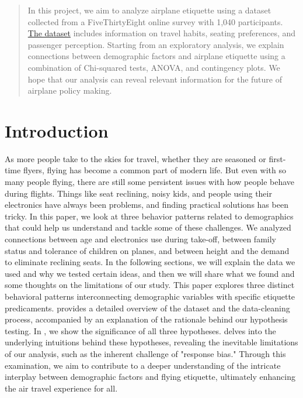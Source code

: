 \documentclass{article}
\theoremstyle{plain}
\theoremstyle{definition}
\theoremstyle{remark}
\begin{document}
\printAffiliationsAndNotice{\icmlEqualContribution} %

\begin{abstract}
In this project, we aim to analyze airplane etiquette using a dataset collected from a FiveThirtyEight online survey with 1,040 participants. \href{https://github.com/fivethirtyeight/data/blob/master/flying-etiquette-survey/flying-etiquette.csv}{The dataset} includes information on travel habits, seating preferences, and passenger perception. Starting from an exploratory analysis, we explain connections between demographic factors and airplane etiquette using a combination of Chi-squared tests, ANOVA, and contingency plots. We hope that our analysis can reveal relevant information for the future of airplane policy making.



\end{abstract}

\section{Introduction}\label{sec:intro}

As more people take to the skies for travel, whether they are seasoned or first-time flyers, flying has become a common part of modern life. But even with so many people flying, there are still some persistent issues with how people behave during flights. Things like seat reclining, noisy kids, and people using their electronics have always been problems, and finding practical solutions has been tricky. In this paper, we look at three behavior patterns related to demographics that could help us understand and tackle some of these challenges. We analyzed connections between age and electronics use during take-off, between family status and tolerance of children on planes, and between height and the demand to eliminate reclining seats. In the following sections, we will explain the data we used and why we tested certain ideas, and then we will share what we found and some thoughts on the limitations of our study. This paper explores three distinct behavioral patterns interconnecting demographic variables with specific etiquette predicaments.  provides a detailed overview of the dataset and the data-cleaning process, accompanied by an explanation of the rationale behind our hypothesis testing. In , we show the significance of all three hypotheses.  delves into the underlying intuitions behind these hypotheses, revealing the inevitable limitations of our analysis, such as the inherent challenge of "response bias." Through this examination, we aim to contribute to a deeper understanding of the intricate interplay between demographic factors and flying etiquette, ultimately enhancing the air travel experience for all.
\end{document}
